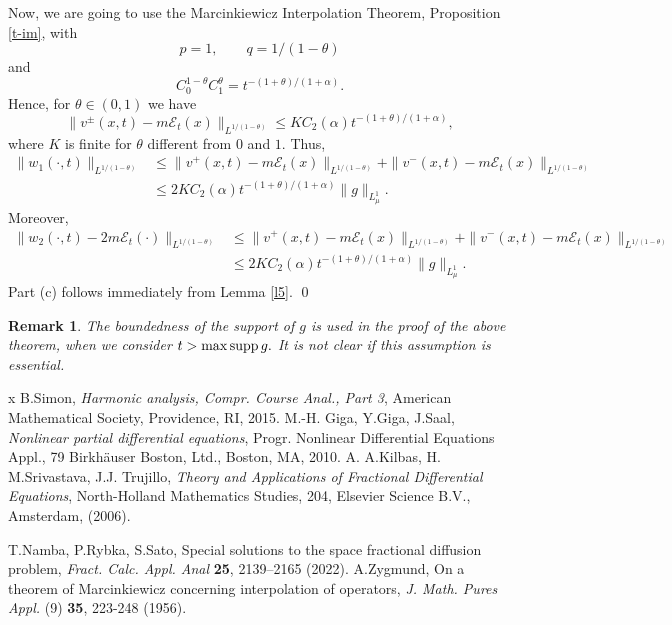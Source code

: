 \documentclass{article}
\newtheorem{remark}{Remark}
\def\sE{{\mathscr{E}}}
\def\supp{\hbox{supp}\, }
\begin{document}
Now, we are going to use the Marcinkiewicz Interpolation Theorem, Proposition \ref{t-im}, with 
$$
p= 1, \qquad q= 1/(1-\theta)
$$
and 
$$
C_0^{1-\theta} C_1^\theta = t^{- (1+\theta)/(1+\alpha)}.
$$
Hence, for $\theta\in (0,1)$ we have
$$
\| v^\pm(x,t) -m \sE_t(x)\|_{L^{1/(1-\theta)}} \le K C_2(\alpha) t^{- (1+\theta)/(1+\alpha)},
$$
where $K$ is finite for $\theta$ different from $0$ and $1.$ Thus,
\begin{align*}
\| w_1 (\cdot, t)\|_{L^{1/(1-\theta)}}& \le 
\|v^+(x,t) -m \sE_t(x) \|_{L^{1/(1-\theta)}} + \|v^-(x,t) -m \sE_t(x) \|_{L^{1/(1-\theta)}} \\ &
\le 2KC_2(\alpha) t^{- (1+\theta)/(1+\alpha)} \| g\|_{L^1_\mu}.   
\end{align*}
Moreover,
\begin{align*}
\|w_2(\cdot,t)-2m\sE_t(\cdot)\|_{L^{1/(1-\theta)}}& \le 
\|v^+(x,t) -m \sE_t(x) \|_{L^{1/(1-\theta)}} + \|v^-(x,t) -m \sE_t(x) \|_{L^{1/(1-\theta)}} \\ &
\le 2K C_2(\alpha) t^{- (1+\theta)/(1+\alpha)} \| g\|_{L^1_\mu}.
\end{align*}
Part (c) follows immediately from Lemma \ref{l5}. \qed
\begin{remark}
The boundedness of the support of $g$ is used in the proof of the above theorem, when we consider $t> \max \supp g.$ It is not clear if this assumption is essential.
\end{remark}
\begin{thebibliography}{x}
B.Simon, {\it Harmonic analysis,
Compr. Course Anal., Part 3},
American Mathematical Society, Providence, RI, 2015.
%
M.-H. Giga, Y.Giga, J.Saal,
{\it Nonlinear partial differential equations},
Progr. Nonlinear Differential Equations Appl., 79
Birkhäuser Boston, Ltd., Boston, MA, 2010.
%
A. A.Kilbas,  H. M.Srivastava, J.J. Trujillo, {\it Theory and Applications of Fractional Differential Equations},
North-Holland Mathematics Studies, 204, Elsevier Science B.V., Amsterdam, (2006).
%

T.Namba, P.Rybka, S.Sato, Special solutions to the space fractional diffusion problem, {\it Fract. Calc. Appl. Anal} {\bf 25}, 2139–2165 (2022).
%
%
A.Zygmund, On a theorem of Marcinkiewicz concerning interpolation of operators, {\it J. Math. Pures Appl.} (9) {\bf 35}, 223-248 (1956).
\end{thebibliography}
\end{document}
